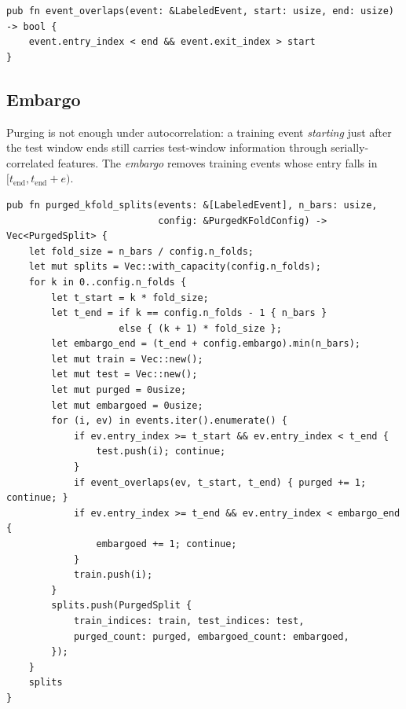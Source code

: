 \begin{lstlisting}[caption={Overlap test for purging}]
pub fn event_overlaps(event: &LabeledEvent, start: usize, end: usize) -> bool {
    event.entry_index < end && event.exit_index > start
}
\end{lstlisting}


\subsection{Embargo}

Purging is not enough under autocorrelation: a training event
\emph{starting} just after the test window ends still carries
test-window information through serially-correlated features. The
\emph{embargo} removes training events whose entry falls in
$[t_{\text{end}}, t_{\text{end}} + e)$.

\begin{lstlisting}[caption={Purged k-fold with embargo}]
pub fn purged_kfold_splits(events: &[LabeledEvent], n_bars: usize,
                           config: &PurgedKFoldConfig) -> Vec<PurgedSplit> {
    let fold_size = n_bars / config.n_folds;
    let mut splits = Vec::with_capacity(config.n_folds);
    for k in 0..config.n_folds {
        let t_start = k * fold_size;
        let t_end = if k == config.n_folds - 1 { n_bars }
                    else { (k + 1) * fold_size };
        let embargo_end = (t_end + config.embargo).min(n_bars);
        let mut train = Vec::new();
        let mut test = Vec::new();
        let mut purged = 0usize;
        let mut embargoed = 0usize;
        for (i, ev) in events.iter().enumerate() {
            if ev.entry_index >= t_start && ev.entry_index < t_end {
                test.push(i); continue;
            }
            if event_overlaps(ev, t_start, t_end) { purged += 1; continue; }
            if ev.entry_index >= t_end && ev.entry_index < embargo_end {
                embargoed += 1; continue;
            }
            train.push(i);
        }
        splits.push(PurgedSplit {
            train_indices: train, test_indices: test,
            purged_count: purged, embargoed_count: embargoed,
        });
    }
    splits
}
\end{lstlisting}

